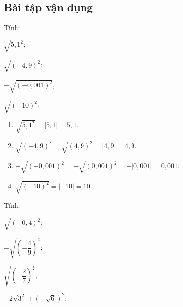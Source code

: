 \subsection{Bài tập vận dụng}
\begin{bt}
	Tính:
	\begin{listEX}[4]
	\item $\sqrt{5{,}1^2}$;
	\item $\sqrt{\left(-4{,}9\right)^2}$;
	\item $-\sqrt{\left(-0{,}001\right)^2}$;
	\item $\sqrt{(-10)^{2}}$.
	\end{listEX}
	\loigiai
	{
	\begin{enumerate}
	\item $\sqrt{5{,}1^2}=\big|5{,}1\big|=5{,}1$.
	\item $\sqrt{\left(-4{,}9\right)^2}=\sqrt{\left(4{,}9\right)^2}=\big|4{,}9\big|=4{,}9$.
	\item $-\sqrt{\left(-0{,}001\right)^2}=-\sqrt{\left(0{,}001\right)^2}=-\big|0{,}001\big|=0{,}001$.
	\item $\sqrt{(-10)^{2}}=|-10| =10$.
	\end{enumerate}	
	}
\end{bt}
\begin{bt}
	Tính:
	\begin{enumEX}{4}
	\item $\sqrt{(-0{,}4)^{2}}$;
	\item $-\sqrt{\left(-\dfrac{4}{9}\right)^{2}}$;
	\item $\sqrt{\left(-\dfrac{2}{7}\right)^{2}}$;
	\item $-2 \sqrt{3^{2}}+(-\sqrt{6})^{2}$.
	\end{enumEX}
\end{bt}
